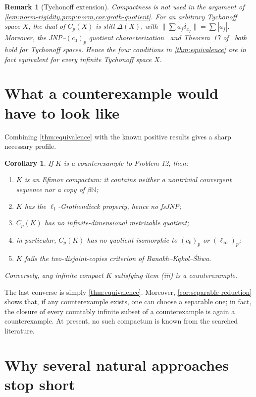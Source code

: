 \documentclass[11pt]{article}
\newtheorem{corollary}[theorem]{Corollary}
\newtheorem{remark}[theorem]{Remark}
\newcommand{\Cp}{C_p}
\newcommand{\N}{\mathbb{N}}
\newcommand{\czerop}{(c_0)_p}
\newcommand{\linfyp}{(\ell_\infty)_p}
\begin{document}
\begin{remark}[Tychonoff extension]\label{rem:tych}
Compactness is not used in the argument of
\cref{lem:norm-rigidity,prop:norm,cor:groth-quotient}.  For an arbitrary
Tychonoff space $X$, the dual of $\Cp(X)$ is still $\Delta(X)$, with
$\|\sum a_j\delta_{x_j}\|=\sum|a_j|$.  Moreover, the JNP--$\czerop$ quotient
characterization~\cite{BKS2019JNP} and Theorem~17 of~\cite{KLS2026} both hold
for Tychonoff spaces.  Hence the four conditions in \cref{thm:equivalence}
are in fact equivalent for every infinite Tychonoff space $X$.
\end{remark}

\section{What a counterexample would have to look like}

Combining \cref{thm:equivalence} with the known positive results gives a sharp
necessary profile.

\begin{corollary}\label{cor:counterexample-profile}
If $K$ is a counterexample to Problem 12, then:
\begin{enumerate}[label=\textup{(\roman*)}]
\item $K$ is an Efimov compactum: it contains neither a nontrivial convergent
      sequence nor a copy of $\beta\N$;
\item $K$ has the $\ell_1$-Grothendieck property, hence no fsJNP;
\item $\Cp(K)$ has no infinite-dimensional metrizable quotient;
\item in particular, $\Cp(K)$ has no quotient isomorphic to $\czerop$ or
      $\linfyp$;
\item $K$ fails the two-disjoint-copies criterion of
      Banakh--K\k{a}kol--\'Sliwa.
\end{enumerate}
Conversely, any infinite compact $K$ satisfying item \textup{(iii)} is a
counterexample.
\end{corollary}

The last converse is simply \cref{thm:equivalence}.  Moreover,
\cref{cor:separable-reduction} shows that, if any counterexample exists, one
can choose a separable one; in fact, the closure of every countably infinite
subset of a counterexample is again a counterexample.  At present, no such
compactum is known from the searched literature.

\section{Why several natural approaches stop short}
\end{document}
